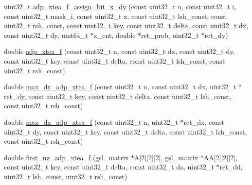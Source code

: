 \begin{DoxyCompactItemize}
\item 
uint32\-\_\-t \hyperlink{adp-xtea-f-fk_8cc_a51b9a2096d1bb092bd775e5cbf1227da}{adp\-\_\-xtea\-\_\-f\-\_\-assign\-\_\-bit\-\_\-x\-\_\-dy} (const uint32\-\_\-t n, const uint32\-\_\-t i, const uint32\-\_\-t mask\-\_\-i, const uint32\-\_\-t x, const uint32\-\_\-t lsh\-\_\-const, const uint32\-\_\-t rsh\-\_\-const, const uint32\-\_\-t key, const uint32\-\_\-t delta, const uint32\-\_\-t dx, const uint32\-\_\-t dy, uint64\-\_\-t $\ast$x\-\_\-cnt, double $\ast$ret\-\_\-prob, uint32\-\_\-t $\ast$ret\-\_\-dy)
\item 
double \hyperlink{adp-xtea-f-fk_8cc_af678f1852341d1a0f4111299fd24f5d8}{adp\-\_\-xtea\-\_\-f} (const uint32\-\_\-t n, const uint32\-\_\-t dx, const uint32\-\_\-t dy, const uint32\-\_\-t key, const uint32\-\_\-t delta, const uint32\-\_\-t lsh\-\_\-const, const uint32\-\_\-t rsh\-\_\-const)
\item 
double \hyperlink{adp-xtea-f-fk_8cc_abbb74922432f62fb3a99b14895c1c4a9}{max\-\_\-dy\-\_\-adp\-\_\-xtea\-\_\-f} (const uint32\-\_\-t n, const uint32\-\_\-t dx, uint32\-\_\-t $\ast$ret\-\_\-dy, const uint32\-\_\-t key, const uint32\-\_\-t delta, const uint32\-\_\-t lsh\-\_\-const, const uint32\-\_\-t rsh\-\_\-const)
\item 
double \hyperlink{adp-xtea-f-fk_8cc_adfcacb279757491adf287170fbd52dfa}{max\-\_\-dx\-\_\-adp\-\_\-xtea\-\_\-f} (const uint32\-\_\-t n, uint32\-\_\-t $\ast$ret\-\_\-dx, const uint32\-\_\-t dy, const uint32\-\_\-t key, const uint32\-\_\-t delta, const uint32\-\_\-t lsh\-\_\-const, const uint32\-\_\-t rsh\-\_\-const)
\item 
double \hyperlink{adp-xtea-f-fk_8cc_afcd00d5c1a88acce22eb6dbf61ee7624}{first\-\_\-nz\-\_\-adp\-\_\-xtea\-\_\-f} (gsl\-\_\-matrix $\ast$\-A\mbox{[}2\mbox{]}\mbox{[}2\mbox{]}\mbox{[}2\mbox{]}, gsl\-\_\-matrix $\ast$\-A\-A\mbox{[}2\mbox{]}\mbox{[}2\mbox{]}\mbox{[}2\mbox{]}, const uint32\-\_\-t key, const uint32\-\_\-t delta, const uint32\-\_\-t da, uint32\-\_\-t $\ast$ret\-\_\-dd, uint32\-\_\-t lsh\-\_\-const, uint32\-\_\-t rsh\-\_\-const)
\end{DoxyCompactItemize}


